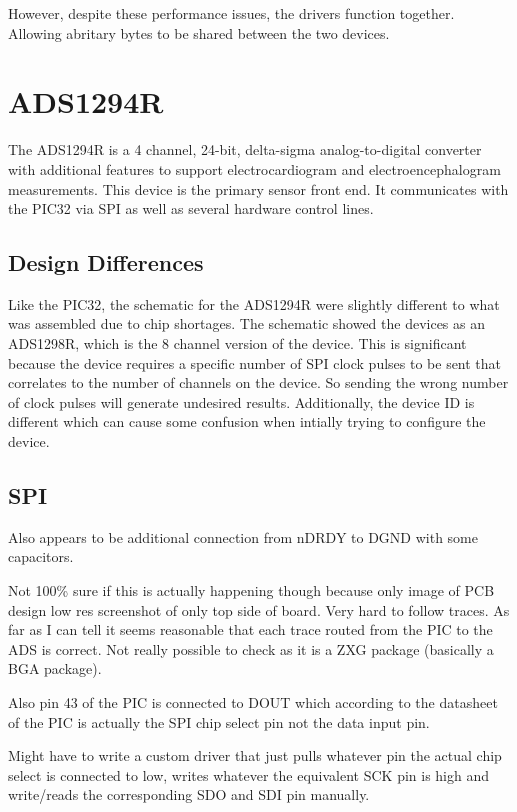 However, despite these performance issues, the drivers function together.
Allowing abritary bytes to be shared between the two devices.


\section{ADS1294R}
The ADS1294R is a 4 channel, 24-bit, delta-sigma analog-to-digital converter with additional features to support electrocardiogram and electroencephalogram measurements.
This device is the primary sensor front end.
It communicates with the PIC32 via SPI as well as several hardware control lines.

\subsection{Design Differences}
Like the PIC32, the schematic for the ADS1294R were slightly different to what was assembled due to chip shortages.
The schematic showed the devices as an ADS1298R, which is the 8 channel version of the device.
This is significant because the device requires a specific number of SPI clock pulses to be sent that correlates to the number of channels on the device.
So sending the wrong number of clock pulses will generate undesired results.
Additionally, the device ID is different which can cause some confusion when intially trying to configure the device.

\subsection{SPI}


Also appears to be additional connection from nDRDY to DGND with some capacitors.

Not 100\% sure if this is actually happening though because only image of PCB design
low res screenshot of only top side of board. Very hard to follow traces.
As far as I can tell it seems reasonable that each trace routed from the PIC to the ADS
is correct. Not really possible to check as it is a ZXG package (basically a BGA package).

Also pin 43 of the PIC is connected to DOUT which according to the datasheet of the PIC
is actually the SPI chip select pin not the data input pin.

Might have to write a custom driver that just pulls whatever pin the actual chip select
is connected to low, writes whatever the equivalent SCK pin is high and write/reads
the corresponding SDO and SDI pin manually.

